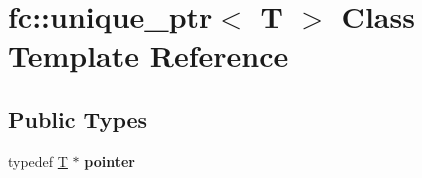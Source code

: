 \hypertarget{classfc_1_1unique__ptr}{}\section{fc\+:\+:unique\+\_\+ptr$<$ T $>$ Class Template Reference}
\label{classfc_1_1unique__ptr}
\subsection*{Public Types}
\begin{DoxyCompactItemize}
\item 
\mbox{\label{classfc_1_1unique__ptr_a06109619a4faf69e1042852d38cff61e}} 
typedef \mbox{\hyperlink{struct_t}{T}} $\ast$ {\bfseries pointer}
\end{DoxyCompactItemize}

